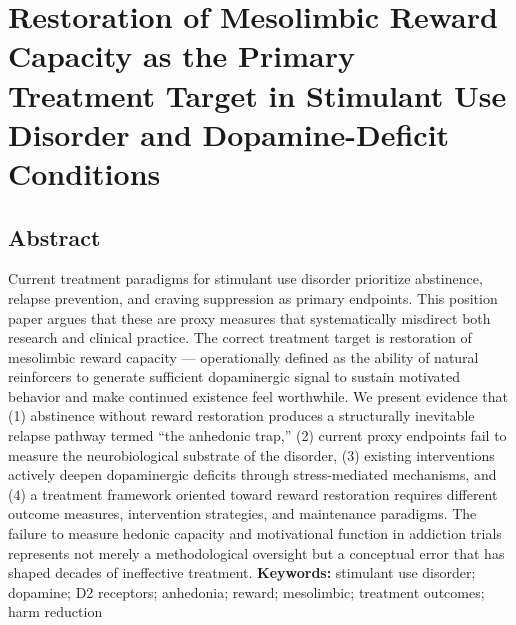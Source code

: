 ﻿\section{Restoration of Mesolimbic Reward Capacity as the Primary Treatment Target in Stimulant Use Disorder and Dopamine-Deficit Conditions}\label{18_restoration-restoration-of-mesolimbic-reward-capacity-as-the-primary-treatment-target-in-stimulant-use-disorder-and-dopamine-deficit-conditions}

\subsection{Abstract}\label{18_restoration-abstract}

Current treatment paradigms for stimulant use disorder prioritize abstinence, relapse prevention, and craving suppression as primary endpoints. This position paper argues that these are proxy measures that systematically misdirect both research and clinical practice. The correct treatment target is restoration of mesolimbic reward capacity --- operationally defined as the ability of natural reinforcers to generate sufficient dopaminergic signal to sustain motivated behavior and make continued existence feel worthwhile. We present evidence that (1) abstinence without reward restoration produces a structurally inevitable relapse pathway termed ``the anhedonic trap,'' (2) current proxy endpoints fail to measure the neurobiological substrate of the disorder, (3) existing interventions actively deepen dopaminergic deficits through stress-mediated mechanisms, and (4) a treatment framework oriented toward reward restoration requires different outcome measures, intervention strategies, and maintenance paradigms. The failure to measure hedonic capacity and motivational function in addiction trials represents not merely a methodological oversight but a conceptual error that has shaped decades of ineffective treatment. \textbf{Keywords:} stimulant use disorder; dopamine; D2 receptors; anhedonia; reward; mesolimbic; treatment outcomes; harm reduction

\subsection{}\label{18_restoration-section}

\subsection{}\label{18_restoration-section-1}

